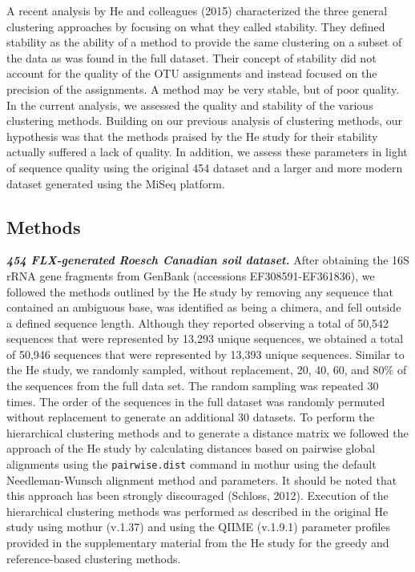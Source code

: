 \documentclass[11pt,]{article}
\begin{document}
A recent analysis by He and colleagues (2015) characterized the three
general clustering approaches by focusing on what they called stability.
They defined stability as the ability of a method to provide the same
clustering on a subset of the data as was found in the full dataset.
Their concept of stability did not account for the quality of the OTU
assignments and instead focused on the precision of the assignments. A
method may be very stable, but of poor quality. In the current analysis,
we assessed the quality and stability of the various clustering methods.
Building on our previous analysis of clustering methods, our hypothesis
was that the methods praised by the He study for their stability
actually suffered a lack of quality. In addition, we assess these
parameters in light of sequence quality using the original 454 dataset
and a larger and more modern dataset generated using the MiSeq platform.

\subsection{Methods}\label{methods}

\textbf{\emph{454 FLX-generated Roesch Canadian soil dataset.}} After
obtaining the 16S rRNA gene fragments from GenBank (accessions
EF308591-EF361836), we followed the methods outlined by the He study by
removing any sequence that contained an ambiguous base, was identified
as being a chimera, and fell outside a defined sequence length. Although
they reported observing a total of 50,542 sequences that were
represented by 13,293 unique sequences, we obtained a total of 50,946
sequences that were represented by 13,393 unique sequences. Similar to
the He study, we randomly sampled, without replacement, 20, 40, 60, and
80\% of the sequences from the full data set. The random sampling was
repeated 30 times. The order of the sequences in the full dataset was
randomly permuted without replacement to generate an additional 30
datasets. To perform the hierarchical clustering methods and to generate
a distance matrix we followed the approach of the He study by
calculating distances based on pairwise global alignments using the
\texttt{pairwise.dist} command in mothur using the default
Needleman-Wunsch alignment method and parameters. It should be noted
that this approach has been strongly discouraged (Schloss, 2012).
Execution of the hierarchical clustering methods was performed as
described in the original He study using mothur (v.1.37) and using the
QIIME (v.1.9.1) parameter profiles provided in the supplementary
material from the He study for the greedy and reference-based clustering
methods.
\end{document}
